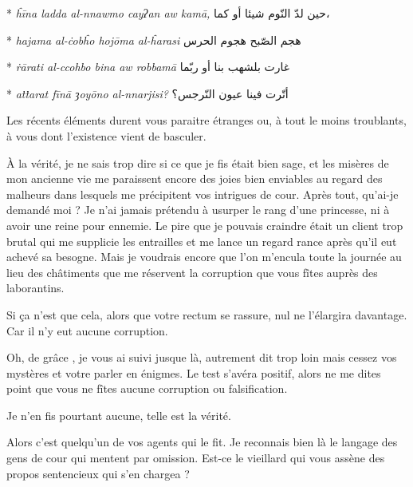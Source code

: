 \begin{drama}
\begin{paracol}{2}
      \switchcolumn[0]*
      \emph{ĥīna ladda al-nnawmo cay{\libertine{}ʔ}an aw kamā,}
      \switchcolumn[1]
      \hfill\textarabic{حين لدّ النّوم شيئا أو كما،}
      
      \switchcolumn[0]*
      \emph{hajama al-ċobĥo hojōma al-ĥarasi}
      \switchcolumn[1]
      \hfill\textarabic{هجم الصّبح هجوم الحرس}
      
      \switchcolumn[0]*
      \emph{ṙārati al-ccohbo bina aw robbamā}
      \switchcolumn[1]
      \hfill\textarabic{غارت بلشهب بنا أو ربّما}
      
      \switchcolumn[0]*
      \emph{aṫṫarat fīnā {\libertine{}ȝ}oyōno al-nnarjisi?}
      \switchcolumn[1]
      \hfill\textarabic{أتّرت فينا عيون النّرجس؟}
    \end{paracol}

   \elenaspeaks Les récents éléments durent vous paraitre étranges ou, à tout le moins troublants, à vous dont l’existence vient de basculer.

   \elaspeaks À la vérité, je ne sais trop dire si ce que je fis était bien sage, et les misères de mon ancienne vie me paraissent encore des joies bien enviables au regard des malheurs dans lesquels me précipitent vos intrigues de cour. Après tout, qu’ai-je demandé moi ? Je n’ai jamais prétendu à usurper le rang d’une princesse, ni à avoir une reine pour ennemie. Le pire que je pouvais craindre était un client trop brutal qui me supplicie les entrailles et me lance un regard rance après qu’il eut achevé sa besogne. 
   Mais je voudrais encore que l’on m’encula toute la journée au lieu des châtiments que me réservent la corruption que vous fîtes auprès des laborantins.

   \elenaspeaks Si ça n’est que cela, alors que votre rectum se rassure, nul ne l’élargira davantage. Car il n’y eut aucune corruption.

   \elaspeaks Oh, de grâce \elena, je vous ai suivi jusque là, autrement dit trop loin mais cessez vos mystères et votre parler en énigmes. Le test s’avéra positif, alors ne me dites point que vous ne fîtes aucune corruption ou falsification.

   \elenaspeaks Je n’en fis pourtant aucune, telle est la vérité.

   \elaspeaks Alors c’est quelqu’un de vos agents qui le fit. Je reconnais bien là le langage des gens de cour qui mentent par omission. Est-ce le vieillard qui vous assène des propos sentencieux qui s’en chargea ?


\end{drama}
